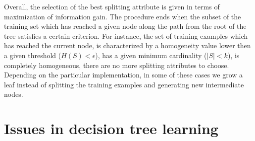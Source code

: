 
Overall, the selection of the best splitting attribute is given in terms of
maximization of information gain. The procedure ends when the subset of the training
set which has reached a given node along the path from the root of the tree satisfies
a certain criterion. For instance, the set of training examples which has reached
the current node, is characterized by a homogeneity value lower then a given
threshold ($H(S)<\epsilon$), has a given minimum cardinality ($|S|<k$), is
completely homogeneous, there are no more splitting attributes to choose.
Depending on the particular implementation, in some of these cases we grow a leaf
instead of splitting the training examples and generating new intermediate nodes.

\section{Issues in decision tree learning}

